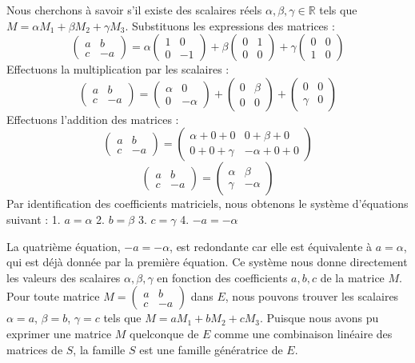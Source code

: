 \documentclass{report}
\begin{document}
Nous cherchons à savoir s'il existe des scalaires réels $\alpha, \beta, \gamma \in \mathbb{R}$ tels que $M = \alpha M_1 + \beta M_2 + \gamma M_3$.
Substituons les expressions des matrices :
$$\begin{pmatrix} a & b \\ c & -a \end{pmatrix} = \alpha \begin{pmatrix} 1 & 0 \\ 0 & -1 \end{pmatrix} + \beta \begin{pmatrix} 0 & 1 \\ 0 & 0 \end{pmatrix} + \gamma \begin{pmatrix} 0 & 0 \\ 1 & 0 \end{pmatrix}$$
Effectuons la multiplication par les scalaires :
$$\begin{pmatrix} a & b \\ c & -a \end{pmatrix} = \begin{pmatrix} \alpha & 0 \\ 0 & -\alpha \end{pmatrix} + \begin{pmatrix} 0 & \beta \\ 0 & 0 \end{pmatrix} + \begin{pmatrix} 0 & 0 \\ \gamma & 0 \end{pmatrix}$$
Effectuons l'addition des matrices :
$$\begin{pmatrix} a & b \\ c & -a \end{pmatrix} = \begin{pmatrix} \alpha+0+0 & 0+\beta+0 \\ 0+0+\gamma & -\alpha+0+0 \end{pmatrix}$$
$$\begin{pmatrix} a & b \\ c & -a \end{pmatrix} = \begin{pmatrix} \alpha & \beta \\ \gamma & -\alpha \end{pmatrix}$$
Par identification des coefficients matriciels, nous obtenons le système d'équations suivant :
1.  $a = \alpha$
2.  $b = \beta$
3.  $c = \gamma$
4.  $-a = -\alpha$

La quatrième équation, $-a = -\alpha$, est redondante car elle est équivalente à $a = \alpha$, qui est déjà donnée par la première équation.
Ce système nous donne directement les valeurs des scalaires $\alpha, \beta, \gamma$ en fonction des coefficients $a, b, c$ de la matrice $M$.
Pour toute matrice $M = \begin{pmatrix} a & b \\ c & -a \end{pmatrix}$ dans $E$, nous pouvons trouver les scalaires $\alpha=a$, $\beta=b$, $\gamma=c$ tels que $M = a M_1 + b M_2 + c M_3$.
Puisque nous avons pu exprimer une matrice $M$ quelconque de $E$ comme une combinaison linéaire des matrices de $S$, la famille $S$ est une famille génératrice de $E$.
\end{document}
